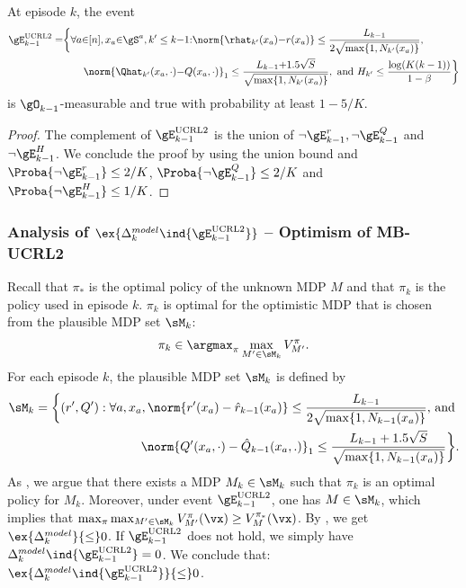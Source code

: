 \begin{lem}
    \label{lem:concentration_ucrl}
    At episode $k$, the event
    \begin{align*}
        \gE^\text{UCRL2}_{k-1} =&\bigg\{ \forall a{\in}[n], x_a{\in}\gS^a, k'\le k{-}1{:}
            \norm{\rhat_{k'}(x_a){-}r(x_a)} \le\frac{L_{k-1}}{2\sqrt{\max\{1,N_{k'}(x_a)\} }}, \\
            &\qquad\norm{\Qhat_{k'}(x_a,\cdot) {-}Q(x_a,\cdot)}_1 \le\frac{L_{k-1}{+}1.5\sqrt{S}}{\sqrt{\max\{1,N_{k'}(x_a)\} }}, \text{ and } H_{k'}\le \frac{\log(K(k-1))}{1-\beta} \bigg\}
    \end{align*}
    is $\gO_{k-1}$-measurable and true with probability at least $1-5/K$.
\end{lem}
\begin{proof}
    The complement of $\gE_{k-1}^\text{UCRL2}$ is the union of $\neg \gE_{k-1}^r, \neg \gE_{k-1}^Q$ and $\neg \gE_{k-1}^H$. We conclude the proof by using the union bound and $\Proba{\neg \gE_{k-1}^r} \le 2/K$, $\Proba{\neg \gE_{k-1}^Q} \le 2/K$ and $\Proba{\neg \gE_{k-1}^H} \le 1/K$. 
\end{proof}

\subsubsection{Analysis of $\ex{\Delta^{model}_k\ind{\gE_{k-1}^\text{UCRL2}}}$ -- Optimism of MB-UCRL2}

Recall that $\pi_*$ is the optimal policy of the unknown MDP $M$ and that $\pi_k$ is the policy used in episode $k$. $\pi_k$ is optimal for the optimistic MDP that is chosen from the plausible MDP set $\sM_k$:
\begin{align*}
    \pi_k \in \argmax_{\pi} \max_{M'\in\sM_k} V^\pi_{M'}.
\end{align*}
For each episode $k$, the plausible MDP set $\sM_k$ is defined by
\begin{align}
    \label{eq:plausible}
    \sM_k=\bigg\{(r',Q'):\forall a, x_a, \norm{r'(x_a)-\hat{r}_{k-1}(x_a)} \le \frac{L_{k-1}}{2\sqrt{\max\{1,N_{k-1}(x_a)\} }} \text{, and }\nonumber\\
    \norm{Q'(x_a,\cdot)-\hat{Q}_{k-1}(x_a, .)}_1 \le \frac{L_{k-1}+1.5\sqrt{S}}{\sqrt{\max\{1,N_{k-1}(x_a)\} }}\bigg\}.
\end{align}
As \cite{jaksch2010near}, we argue that there exists a MDP $M_k\in\sM_k$ such that $\pi_k$ is an optimal policy for $M_k$. Moreover, under event $\gE^\text{UCRL2}_{k-1}$, one has $M\in \sM_k$, which implies that $\max_{\pi}\max_{M'\in \sM_k} V^{\pi}_{M'}(\vx)\ge V^{\pi_*}_M(\vx)$. By , we get $\ex{\Delta^{model}_k}{\le} 0$.
If $\gE^\text{UCRL2}_{k-1}$ does not hold, we simply have $\Delta^{model}_k\ind{\gE_{k-1}^\text{UCRL2}}=0$. We conclude that: $\ex{\Delta^{model}_k\ind{\gE^\text{UCRL2}_{k-1}}}{\le}0$. 


